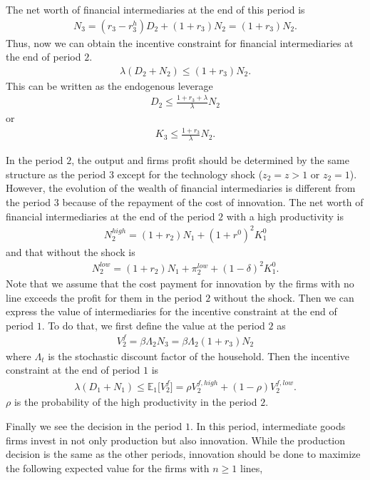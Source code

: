 \documentclass[a4paper,12pt]{article}
\begin{document}
 The net worth of financial intermediaries at the end of this period is
\begin{align}
    N_3 = (r_3 - r_3^h)D_2 + (1+r_3)N_2 = (1+r_3)N_2.
\end{align}
Thus, now we can obtain the incentive constraint for financial intermediaries at the end of period $2$.
\begin{align}
    \lambda (D_2 + N_2) \leq (1+r_3) N_2.
\end{align}
This can be written as the endogenous leverage
\begin{align}
    D_2 \leq \frac{1+r_3+\lambda}{\lambda}N_2
\end{align}
or
\begin{align}
    K_3 \leq \frac{1+r_3}{\lambda}N_2.
\end{align}
\par
In the period $2$, the output and firms profit should be determined by the same structure as the period $3$ except for the technology shock ($z_2=z>1$ or $z_2 =1$). However, the evolution of the wealth of financial intermediaries is different from the period $3$ because of the repayment of the cost of innovation. The net worth of financial intermediaries at the end of the period $2$ with a high productivity is
\begin{align}
    N_2^{high} = (1+r_2) N_1 + (1+r^0)^2 K_1^0
\end{align}
and that without the shock is
\begin{align}
    N_2^{low} = (1+r_2) N_1 + \pi_2^{low} + (1-\delta)^2 K_1^0.
\end{align}
Note that we assume that the cost payment for innovation by the firms with no line exceeds the profit for them in the period $2$ without the shock.
Then we can express the value of intermediaries for the incentive constraint at the end of period $1$. To do that, we first define the value at the period $2$ as
\begin{align}
    V_2^f = \beta\Lambda_2 N_3 = \beta\Lambda_2 (1+r_3)N_2
\end{align}
where $\Lambda_t$ is the stochastic discount factor of the household. Then the incentive constraint at the end of period $1$ is
\begin{align}
    \lambda (D_1 + N_1) \leq \mathbb{E}_1 \big[V_2^f\big] = \rho V_2^{f, high} + (1-\rho)V_2^{f, low}.
\end{align}
$\rho$ is the probability of the high productivity in the period $2$. \par
Finally we see the decision in the period $1$. In this period, intermediate goods firms invest in not only production but also innovation. While the production decision is the same as the other periods, innovation should be done to maximize the following expected value for the firms with $n\geq 1$ lines,
\end{document}
